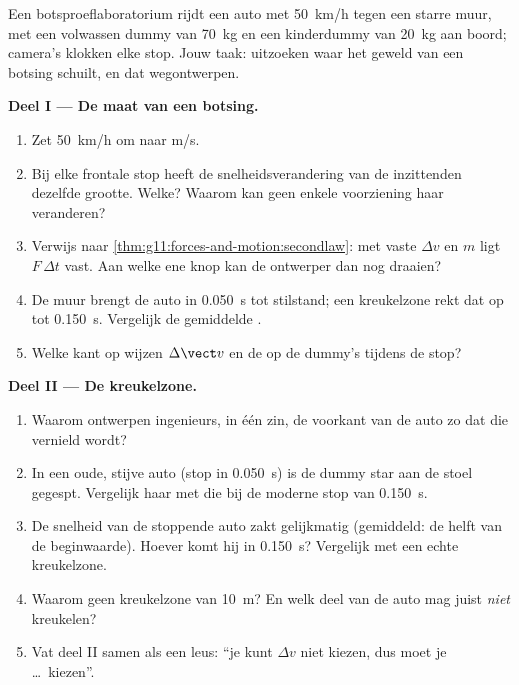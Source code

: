 \begin{problem}
\label{pb:g11:forces-and-motion:1}
Een botsproeflaboratorium rijdt een auto met \qty{50}{km/h} tegen een
starre muur, met een volwassen dummy van \qty{70}{kg} en een kinderdummy
van \qty{20}{kg} aan boord; camera's klokken elke stop. Jouw taak:
uitzoeken waar het geweld van een botsing schuilt, en dat wegontwerpen.

\medskip
\noindent\textbf{Deel I --- De maat van een botsing.}
\begin{enumerate}
  \item Zet \qty{50}{km/h} om naar \unit{m/s}.
  \item Bij elke frontale stop heeft de snelheidsverandering van de
        inzittenden dezelfde grootte. Welke? Waarom kan geen enkele
        voorziening haar veranderen?
  \item Verwijs naar \cref{thm:g11:forces-and-motion:secondlaw}: met vaste
        $\Delta v$ en $m$ ligt $F\,\Delta t$ vast. Aan welke ene knop kan
        de ontwerper dan nog draaien?
  \item De muur brengt de auto in \qty{0.050}{s} tot stilstand; een
        kreukelzone rekt dat op tot \qty{0.150}{s}. Vergelijk de
        gemiddelde .
  \item Welke kant op wijzen $\Delta \vect v$ en de  op
        de dummy's tijdens de stop?
\end{enumerate}

\medskip
\noindent\textbf{Deel II --- De kreukelzone.}
\begin{enumerate}[resume]
  \item Waarom ontwerpen ingenieurs, in één zin, de voorkant van de auto
        zo dat die vernield wordt?
  \item In een oude, stijve auto (stop in \qty{0.050}{s}) is de dummy
        star aan de stoel gegespt. Vergelijk haar  met die bij de
        moderne stop van \qty{0.150}{s}.
  \item De snelheid van de stoppende auto zakt gelijkmatig (gemiddeld: de
        helft van de beginwaarde). Hoever komt hij in \qty{0.150}{s}?
        Vergelijk met een echte kreukelzone.
  \item Waarom geen kreukelzone van \qty{10}{m}? En welk deel van de auto
        mag juist \emph{niet} kreukelen?
  \item Vat deel II samen als een leus: ``je kunt $\Delta v$ niet kiezen,
        dus moet je \dots\ kiezen''.
\end{enumerate}


\end{problem}
